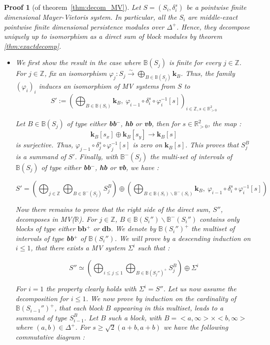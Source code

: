 \documentclass[a4paper, english, 11pt]{article}
\newcommand{\kk}[0]{\textbf{k}}
\newcommand{\0}{\vec{0}}
\newcommand{\R}[0]{\mathbb{R}}
\newcommand{\Z}[0]{\mathbb{Z}}
\newtheorem*{pf}{Proof} }
\begin{document}
\begin{pf}[of theorem~\ref{thm:decom_MV}] Let $S =(S_i,\delta_i^s)$ be a pointwise finite dimensional Mayer-Vietoris system. In particular, all the $S_i$ are middle-exact pointwise finite dimensional persistence modules over $\Delta^+$. Hence, they decompose uniquely up to isomorphism as a direct sum of block modules by theorem \ref{thm:exactdecomp}.
\begin{itemize}
    \item[The finite barcode case :] We first show the result in the case where $\mathbb{B}(S_j)$ is finite for every $j\in\Z$.  For $j\in\Z$, fix an isomorphism $\varphi_j : S_j \stackrel{\sim}{\longrightarrow}\bigoplus_{B\in\mathbb{B}(S_j)}\kk_B$. Thus, the family $(\varphi_i)_i$ induces an isomorphism of MV systems from $S$ to 
    $$S' := \left(\bigoplus_{B\in\mathbb{B}(S_i)}\kk_B, ~\varphi_{i-1}\circ \delta_i^s \circ \varphi_i^{-1}[s] \right )_{i\in\Z,s\in \R_{>0}^2}$$ 
  
  Let $B\in \mathbb{B}(S_j)$ of type either \textbf{bb}$^-$, \textbf{hb} or \textbf{vb}, then for $s\in \R_{>0}^2$, the map :  $$\kk_B[s_x]\oplus\kk_B[s_y]\longrightarrow \kk_B[s]$$ is surjective. Thus,  $\varphi_{j-1}\circ \delta_j^s \circ \varphi_j^{-1}[s]$ is zero on $\kk_B[s]$. This proves that $S^B_j$ is a summand of $S'$. Finally, with $\mathbb{B}^{-}(S_j)$ the multi-set of intervals of $\mathbb{B}(S_j)$ of type either \textbf{bb}$^-$, \textbf{hb} or \textbf{vb}, we have : 
  
 $$S' = \left (\bigoplus_{j\in\Z} \bigoplus_{B\in  \mathbb{B}^{-}(S_j) } S^B_j \right ) \oplus \left ( \bigoplus_{B\in\mathbb{B}(S_i)\backslash \mathbb{B}^{-}(S_i)}\kk_B, ~\varphi_{i-1}\circ \delta_i^s \circ \varphi_i^{-1}[s] \right )$$ 
 
 Now there remains to prove that the right side of the direct sum, $S''$, decomposes in MV($\R$). For $j\in\Z$, $B\in\mathbb{B}(S_i'')\backslash \mathbb{B}^{-}(S_i'')$ contains only blocks of type either $\textbf{bb$^+$}$ or $\textbf{db}$. We denote by $\mathbb{B}(S_i'')^+$ the multiset of intervals of type \textbf{bb$^+$} of $\mathbb{B}(S_i'')$.
 We will prove by a descending induction on $i\leq 1$, that there exists a MV system $\Sigma^i$ such that : 
 
 $$S'' \simeq \left ( \bigoplus_{i\leq j\leq 1} \bigoplus_{B\in \mathbb{B}(S_j'')^+ } S_j^B \right ) \oplus \Sigma^i $$
 
 For $i = 1$ the property clearly holds with $\Sigma^i = S''$.
 Let us now assume the decomposition for $i\leq 1$. We now prove by induction on the cardinality of $\mathbb{B}(S_{i-1}'')^+$, that each block $B$ appearing in this multiset, leads to a summand of type $S_{i-1}^B$. Let $B$ such a block, with $B = <a,\infty> \times <b,\infty>$ where $(a,b) \in \Delta^+$. For $s \geq \sqrt{2}(a+b,a+b)$  we have the following commutative diagram : 
 

\end{itemize}
\end{pf}
\end{document}

